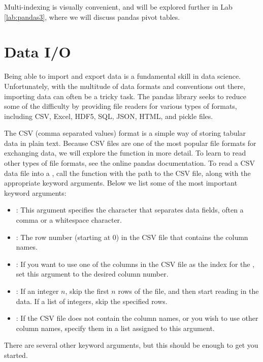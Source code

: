 Multi-indexing is visually convenient, and will be explored further in Lab \ref{lab:pandas3}, where we will discuss pandas pivot tables.

\section*{Data I/O}
Being able to import and export data is a fundamental skill in data science. Unfortunately, with the
multitude of data formats and conventions out there, importing data can often be a tricky task. The pandas library
seeks to reduce some of the difficulty by providing file readers for various types of formats, including
CSV, Excel, HDF5, SQL, JSON, HTML, and pickle files.

The CSV (comma separated values) format is a simple way of storing tabular data in plain text. Because CSV files are one of the most popular file formats for exchanging data, we will explore the
 function in more detail. To learn to read other types of file formats, see the online pandas documentation.
To read a CSV data file into a , call the  function with the path to the CSV file,
along with the appropriate keyword arguments. Below we list some of the most important keyword arguments:
\begin{itemize}
\item {}:
This argument specifies the character that separates data fields, often a comma or a whitespace character.

\item {}:
The row number (starting at 0) in the CSV file that contains the column names.

\item {}:
If you want to use one of the columns in the CSV file as the index for the ,
set this argument to the desired column number.

\item {}:
If an integer $n$, skip the first $n$ rows of the file, and then start reading in the data. If a list
of integers, skip the specified rows.

\item {}:
If the CSV file does not contain the column names, or you wish to use other column names, specify them
in a list assigned to this argument.

\end{itemize}
There are several other keyword arguments, but this should be enough to get you started.

